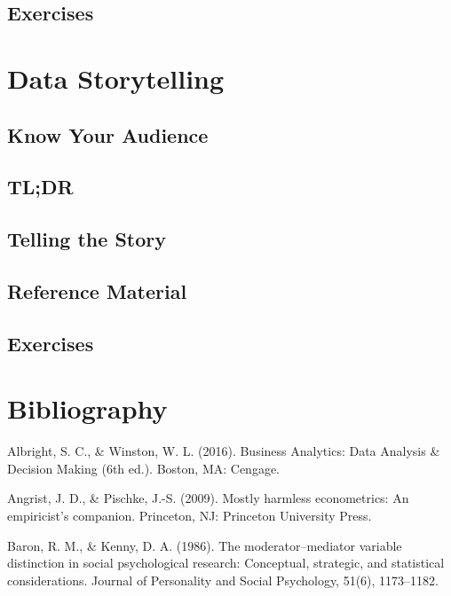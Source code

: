 \documentclass[]{book}
\begin{document}
\hypertarget{exercises-13}{%
\section{Exercises}\label{exercises-13}}

\hypertarget{storytelling}{%
\chapter{Data Storytelling}\label{storytelling}}

\hypertarget{know-your-audience}{%
\section{Know Your Audience}\label{know-your-audience}}

\hypertarget{tldr}{%
\section{TL;DR}\label{tldr}}

\hypertarget{telling-the-story}{%
\section{Telling the Story}\label{telling-the-story}}

\hypertarget{reference-material}{%
\section{Reference Material}\label{reference-material}}

\hypertarget{exercises-14}{%
\section{Exercises}\label{exercises-14}}

\hypertarget{bibli}{%
\chapter{Bibliography}\label{bibli}}

Albright, S. C., \& Winston, W. L. (2016). Business Analytics: Data Analysis \& Decision Making (6th ed.). Boston, MA: Cengage.

Angrist, J. D., \& Pischke, J.-S. (2009). Mostly harmless econometrics: An empiricist's companion. Princeton, NJ: Princeton University Press.

Baron, R. M., \& Kenny, D. A. (1986). The moderator--mediator variable distinction in social psychological research: Conceptual, strategic, and statistical considerations. Journal of Personality and Social Psychology, 51(6), 1173--1182.
\end{document}
